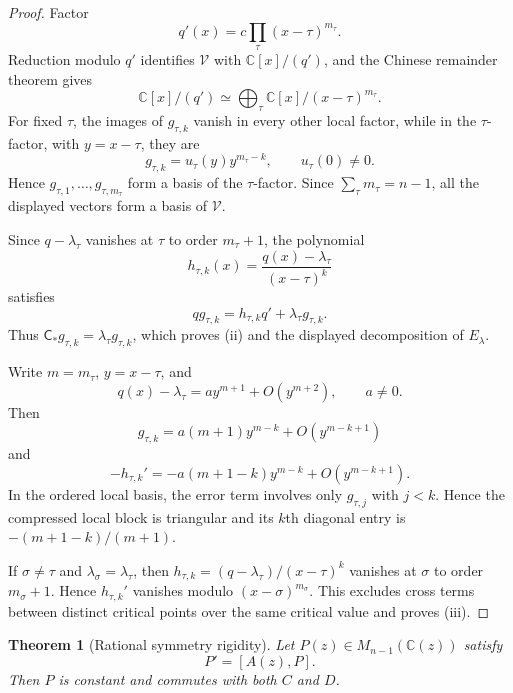 \documentclass[11pt]{article}
\numberwithin{equation}{section}
\newtheorem{theorem}{Theorem}[section]
\theoremstyle{definition}
\theoremstyle{remark}
\newcommand{\C}{\mathbb C}
\newcommand{\Vcal}{\mathscr V}
\begin{document}
\begin{proof}
Factor
\[
  q'(x)=c\prod_\tau(x-\tau)^{m_\tau}.
\]
Reduction modulo $q'$ identifies $\Vcal$ with $\C[x]/(q')$, and the Chinese
remainder theorem gives
\[
  \C[x]/(q')
  \simeq
  \bigoplus_\tau\C[x]/(x-\tau)^{m_\tau}.
\]
For fixed $\tau$, the images of $g_{\tau,k}$ vanish in every other local
factor, while in the $\tau$-factor, with $y=x-\tau$, they are
\[
  g_{\tau,k}=u_\tau(y)y^{m_\tau-k},
  \qquad u_\tau(0)\ne0.
\]
Hence $g_{\tau,1},\ldots,g_{\tau,m_\tau}$ form a basis of the $\tau$-factor.
Since $\sum_\tau m_\tau=n-1$, all the displayed vectors form a basis of
$\Vcal$.

Since $q-\lambda_\tau$ vanishes at $\tau$ to order $m_\tau+1$, the polynomial
\[
  h_{\tau,k}(x)=\frac{q(x)-\lambda_\tau}{(x-\tau)^k}
\]
satisfies
\[
  qg_{\tau,k}=h_{\tau,k}q'+\lambda_\tau g_{\tau,k}.
\]
Thus $\mathsf C_*g_{\tau,k}=\lambda_\tau g_{\tau,k}$, which proves (ii) and
the displayed decomposition of $E_\lambda$.

Write $m=m_\tau$, $y=x-\tau$, and
\[
  q(x)-\lambda_\tau=ay^{m+1}+O(y^{m+2}),
  \qquad a\ne0.
\]
Then
\[
  g_{\tau,k}=a(m+1)y^{m-k}+O(y^{m-k+1})
\]
and
\[
  -h_{\tau,k}'
  =-a(m+1-k)y^{m-k}+O(y^{m-k+1}).
\]
In the ordered local basis, the error term involves only
$g_{\tau,j}$ with $j<k$.  Hence the compressed local block is triangular and
its $k$th diagonal entry is $-(m+1-k)/(m+1)$.

If $\sigma\ne\tau$ and $\lambda_\sigma=\lambda_\tau$, then
$h_{\tau,k}=(q-\lambda_\tau)/(x-\tau)^k$ vanishes at $\sigma$ to order
$m_\sigma+1$.  Hence $h_{\tau,k}'$ vanishes modulo
$(x-\sigma)^{m_\sigma}$.  This excludes cross terms between distinct critical
points over the same critical value and proves (iii).
\end{proof}

\begin{theorem}[Rational symmetry rigidity]\label{thm:end-rigidity}
Let $P(z)\in M_{n-1}(\C(z))$ satisfy
\begin{equation}\label{eq:endomorphism-equation}
  P'=[A(z),P].
\end{equation}
Then $P$ is constant and commutes with both $C$ and $D$.
\end{theorem}
\end{document}
